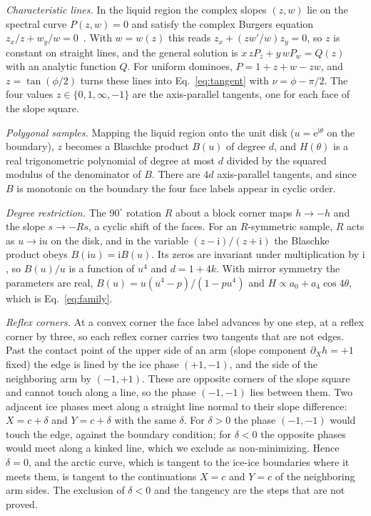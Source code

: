 \documentclass[reprint,aps,prb,floatfix,longbibliography,amsmath,amssymb]{revtex4-2}
\newcommand{\ii}{\mathrm{i}}
\newcommand{\ee}{\mathrm{e}}
\begin{document}
\emph{Characteristic lines.} In the liquid region the complex slopes $(z,w)$ lie on the spectral curve $P(z,w)=0$ and satisfy the complex Burgers equation $z_x/z+w_y/w=0$~\cite{Kenyon2007}. With $w=w(z)$ this reads $z_x+(zw'/w)z_y=0$, so $z$ is constant on straight lines, and the general solution is $x\,zP_z+y\,wP_w=Q(z)$ with an analytic function $Q$. For uniform dominoes, $P=1+z+w-zw$, and $z=\tan(\phi/2)$ turns these lines into Eq.~\eqref{eq:tangent} with $\nu=\phi-\pi/2$. The four values $z\in\{0,1,\infty,-1\}$ are the axis-parallel tangents, one for each face of the slope square.

\emph{Polygonal samples.} Mapping the liquid region onto the unit disk ($u=\ee^{\ii\theta}$ on the boundary), $z$ becomes a Blaschke product $B(u)$ of degree $d$, and $H(\theta)$ is a real trigonometric polynomial of degree at most $d$ divided by the squared modulus of the denominator of $B$. There are $4d$ axis-parallel tangents, and since $B$ is monotonic on the boundary the four face labels appear in cyclic order.

\emph{Degree restriction.} The $90^\circ$ rotation $R$ about a block corner maps $h\to-h$ and the slope $s\to-Rs$, a cyclic shift of the faces. For an $R$-symmetric sample, $R$ acts as $u\to\ii u$ on the disk, and in the variable $(z-\ii)/(z+\ii)$ the Blaschke product obeys $B(\ii u)=\ii B(u)$. Its zeros are invariant under multiplication by $\ii$, so $B(u)/u$ is a function of $u^4$ and $d=1+4k$. With mirror symmetry the parameters are real, $B(u)=u(u^4-p)/(1-pu^4)$ and $H\propto a_0+a_4\cos4\theta$, which is Eq.~\eqref{eq:family}.

\emph{Reflex corners.} At a convex corner the face label advances by one step, at a reflex corner by three, so each reflex corner carries two tangents that are not edges. Past the contact point of the upper side of an arm (slope component $\partial_Xh=+1$ fixed) the edge is lined by the ice phase $(+1,-1)$, and the side of the neighboring arm by $(-1,+1)$. These are opposite corners of the slope square and cannot touch along a line, so the phase $(-1,-1)$ lies between them. Two adjacent ice phases meet along a straight line normal to their slope difference: $X=c+\delta$ and $Y=c+\delta$ with the same $\delta$. For $\delta>0$ the phase $(-1,-1)$ would touch the edge, against the boundary condition; for $\delta<0$ the opposite phases would meet along a kinked line, which we exclude as non-minimizing. Hence $\delta=0$, and the arctic curve, which is tangent to the ice-ice boundaries where it meets them, is tangent to the continuations $X=c$ and $Y=c$ of the neighboring arm sides. The exclusion of $\delta<0$ and the tangency are the steps that are not proved.
\end{document}
